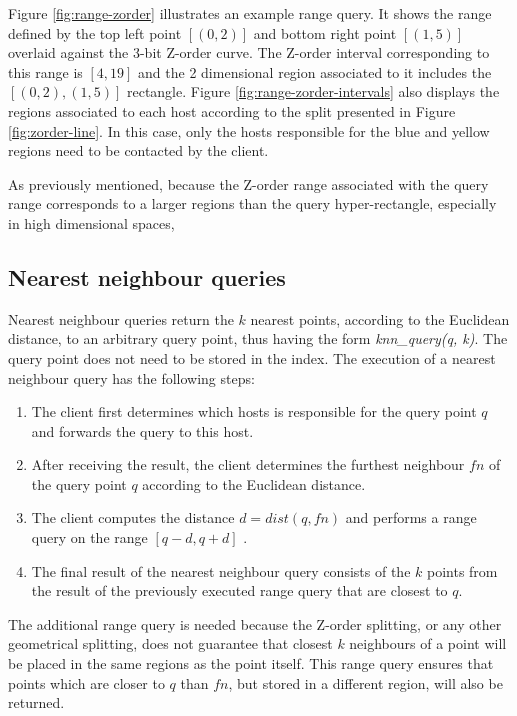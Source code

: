 \documentclass[11pt,a4paper]{globis-book}
\begin{document}
Figure \ref{fig:range-zorder} illustrates an example range query. It shows the range defined by the top left point $[(0, 2)]$ and bottom right point $[(1, 5)]$ overlaid against the 3-bit Z-order curve. The Z-order interval corresponding to this range is $[4, 19]$ and the 2 dimensional region associated to it includes the $[(0, 2), (1, 5)]$ rectangle. Figure \ref{fig:range-zorder-intervals} also displays the regions associated to each host according to the split presented in Figure \ref{fig:zorder-line}. In this case, only the hosts responsible for the blue and yellow regions need to be contacted by the client. 

As previously mentioned, because the Z-order range associated with the query range corresponds to a larger regions than the query hyper-rectangle, especially in high dimensional spaces, 

\subsection{Nearest neighbour queries}

Nearest neighbour queries return the $k$ nearest points, according to the Euclidean distance, to an arbitrary query point, thus having the form \textit{knn\_query(q, k)}. The query point does not need to be stored in the index. The execution of a nearest neighbour query has the following steps:
\begin{enumerate}
    \item The client first determines which hosts is responsible for the query point $q$ and forwards the query to this host.
    \item After receiving the result, the client determines the furthest neighbour $fn$ of the query point $q$ according to the Euclidean distance. 
    \item The client computes the distance $d = dist(q, fn)$ and performs a range query on the range $[q - d, q + d]$ .
    \item The final result of the nearest neighbour query consists of the $k$ points from the result of the previously executed range query that are closest to $q$.  
\end{enumerate}

The additional range query is needed because the Z-order splitting, or any other geometrical splitting, does not guarantee that closest $k$ neighbours of a point will be placed in the same regions as the point itself. This range query ensures that points which are closer to $q$ than $fn$, but stored in a different region, will also be returned. 
\end{document}
